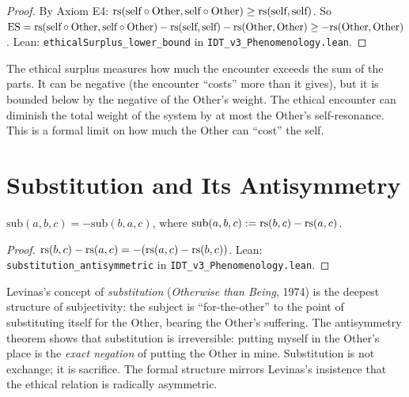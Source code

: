 \begin{proof}
By Axiom E4: $\mathrm{rs}(\text{self} \circ \text{Other}, \text{self} \circ \text{Other}) \geq \mathrm{rs}(\text{self}, \text{self})$.
So $\mathrm{ES} = \mathrm{rs}(\text{self} \circ \text{Other}, \text{self} \circ \text{Other}) - \mathrm{rs}(\text{self}, \text{self}) - \mathrm{rs}(\text{Other}, \text{Other}) \geq -\mathrm{rs}(\text{Other}, \text{Other})$.
Lean: \texttt{ethicalSurplus\_lower\_bound} in \texttt{IDT\_v3\_Phenomenology.lean}.
\end{proof}

\begin{interpretation}
The ethical surplus measures how much the encounter exceeds the sum of the
parts. It can be negative (the encounter ``costs'' more than it gives), but
it is bounded below by the negative of the Other's weight. The ethical
encounter can diminish the total weight of the system by at most the Other's
self-resonance. This is a formal limit on how much the Other can ``cost''
the self.
\end{interpretation}

\section{Substitution and Its Antisymmetry}

\begin{theorem}
\label{thm:substitution}
$\mathrm{sub}(a, b, c) = -\mathrm{sub}(b, a, c)$,
where $\mathrm{sub}(a, b, c) := \mathrm{rs}(b, c) - \mathrm{rs}(a, c)$.
\end{theorem}

\begin{proof}
$\mathrm{rs}(b,c) - \mathrm{rs}(a,c) = -(\mathrm{rs}(a,c) - \mathrm{rs}(b,c))$.
Lean: \texttt{substitution\_antisymmetric} in \texttt{IDT\_v3\_Phenomenology.lean}.
\end{proof}

\begin{interpretation}
Levinas's concept of \emph{substitution} (\textit{Otherwise than Being}, 1974)
is the deepest structure of subjectivity: the subject is ``for-the-other''
to the point of substituting itself for the Other, bearing the Other's
suffering. The antisymmetry theorem shows that substitution is irreversible:
putting myself in the Other's place is the \emph{exact negation} of putting the
Other in mine. Substitution is not exchange; it is sacrifice. The formal
structure mirrors Levinas's insistence that the ethical relation is radically
asymmetric.
\end{interpretation}

